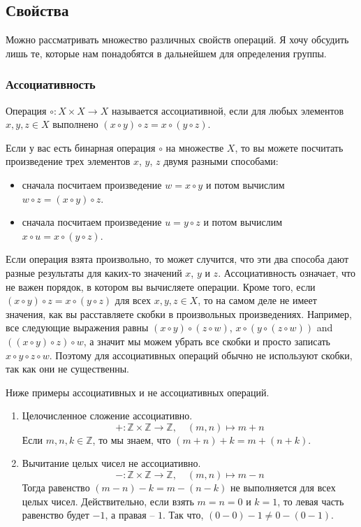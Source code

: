 \subsection{Свойства}

Можно рассматривать множество различных свойств операций.
Я хочу обсудить лишь те, которые нам понадобятся в дальнейшем для определения группы.

\subsubsection{Ассоциативность}

\begin{definition}
Операция $\circ \colon X\times X\to X$ называется ассоциативной, если для любых элементов $x, y, z\in X$ выполнено $(x\circ y)\circ z = x\circ (y\circ z)$.
\end{definition}

Если у вас есть бинарная операция $\circ$ на множестве $X$, то вы можете посчитать произведение трех элементов $x$, $y$, $z$ двумя разными способами:
\begin{itemize}
\item сначала посчитаем произведение $w = x\circ y$ и потом вычислим $w \circ z = (x\circ y) \circ z$.

\item сначала посчитаем произведение $u = y \circ z$ и потом вычислим $x \circ u = x \circ (y\circ z)$.
\end{itemize}
Если операция взята произвольно, то может случится, что эти два способа дают разные результаты для каких-то значений $x$, $y$ и $z$.
Ассоциативность означает, что не важен порядок, в котором вы вычисляете операции.
Кроме того, если $(x\circ y) \circ z = x \circ (y \circ z)$ для всех $x,y,z\in X$, то на самом деле не имеет значения, как вы расставляете скобки в произвольных произведениях.
Например, все следующие выражения равны $(x\circ y)\circ (z\circ w)$, $x\circ (y\circ (z\circ  w))$ and $((x\circ  y)\circ z)\circ w$, а значит мы можем убрать все скобки и просто записать $x\circ  y \circ z \circ w$.
Поэтому для ассоциативных операций обычно не используют скобки, так как они не существенны.

\begin{examples}
Ниже примеры ассоциативных и не ассоциативных операций.
\begin{enumerate}
\item Целочисленное сложение ассоциативно.
\[
+\colon \mathbb Z\times \mathbb Z\to \mathbb Z,\quad (m,n)\mapsto m+n
\]
Если $m,n,k\in \mathbb Z$, то мы знаем, что $(m + n) + k = m + (n + k)$.

\item Вычитание целых чисел не ассоциативно.
\[
-\colon \mathbb Z\times \mathbb Z\to \mathbb Z,\quad (m,n)\mapsto m-n
\]
Тогда равенство $(m - n) - k = m - (n - k)$ не выполняется для всех целых чисел.
Действительно, если взять $m = n = 0$ и $k = 1$, то левая часть равенство будет $-1$, а правая -- $1$.
Так что, $(0 - 0) - 1 \neq 0 - (0 - 1)$.
\end{enumerate}
\end{examples}

